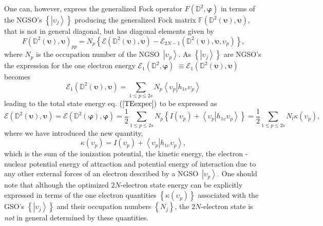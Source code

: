 \documentclass[aps,preprint]{revtex4}%
\begin{document}
One can, however, express the generalized Fock operator $F\left(
\mathbb{D}^{2},\mathbf{\varphi}\right)  $ in terms of the NGSO's $\left\{
\left\vert \upsilon_{j}\right\rangle \right\}  $ producing the generalized
Fock matrix $\mathbb{F}\left(  \mathbb{D}^{2}\left(  \mathbf{\upsilon}\right)
,\mathbf{\upsilon}\right)  ,$ that is not in general diagonal, but has
diagonal elements given by
\begin{equation}
F\left(  \mathbb{D}^{2}\left(  \mathbf{\upsilon}\right)  ,\mathbf{\upsilon
}\right)  _{pp}=N_{p}\left\{  \mathcal{E}\left(  \mathbb{D}^{2}\left(
\mathbf{\upsilon}\right)  ,\mathbf{\upsilon}\right)  -\mathcal{E}%
_{2N-1}\left(  \mathbb{D}^{2}\left(  \mathbf{\upsilon}\right)
,\mathbf{\upsilon,}\upsilon_{p}\right)  \right\}  ,
\end{equation}
where $N_{p}$ is the occupation number of the NGSO\ $\left\vert \upsilon
_{p}\right\rangle $. As $\left\{  \left\vert \upsilon_{j}\right\rangle
\right\}  $ are NGSO's the expression for the one electron energy
$\mathcal{E}_{1}\left(  \mathbb{D}^{2},\mathbf{\varphi}\right)  $
$\equiv\mathcal{E}_{1}\left(  \mathbb{D}^{2}\left(  \mathbf{\upsilon}\right)
,\mathbf{\upsilon}\right)  $ becomes%
\begin{equation}
\mathcal{E}_{1}\left(  \mathbb{D}^{2}\left(  \mathbf{\upsilon}\right)
,\mathbf{\upsilon}\right)  =\sum_{1\leq p\leq2s}N_{p}\left\langle \left.
\upsilon_{p}\right\vert h_{1\upsilon}\upsilon_{p}\right\rangle
\end{equation}
leading to the total state energy eq. $\left(  \ref{TEexpec}\right)  $ to be
expressed as
\begin{equation}
\mathcal{E}\left(  \mathbb{D}^{2}\left(  \mathbf{\upsilon}\right)
,\mathbf{\upsilon}\right)  =\mathcal{E}\left(  \mathbb{D}^{2}\left(
\mathbf{\varphi}\right)  ,\mathbf{\varphi}\right)  =\frac{1}{2}\sum_{1\leq
p\leq2s}N_{p}\left\{  I\left(  \upsilon_{p}\right)  +\left\langle \left.
\upsilon_{p}\right\vert h_{1\upsilon}\upsilon_{p}\right\rangle \right\}
=\frac{1}{2}%
{\textstyle\sum\limits_{1\leq p\leq2s}}
N_{l}\kappa\left(  \upsilon_{p}\right)  ,
\end{equation}
where we have introduced the new quantity,
\begin{equation}
\kappa\left(  \upsilon_{p}\right)  =I\left(  \upsilon_{p}\right)
+\left\langle \left.  \upsilon_{p}\right\vert h_{1\upsilon}\upsilon
_{p}\right\rangle ,
\end{equation}
which is the sum of the ionization potential, the kinetic energy, the electron
- nuclear potential energy of attraction and potential energy of interaction
due to any other external forces of an electron described by a
NGSO\ $\left\vert \upsilon_{p}\right\rangle $. One should note that although
the optimized $2N$-electron state energy can be explicitly expressed in terms
of the one electron quantities $\left\{  \kappa\left(  \upsilon_{p}\right)
\right\}  $ associated with the GSO's $\left\{  \left\vert \upsilon
_{j}\right\rangle \right\}  $ and their occupation numbers $\left\{
N_{j}\right\}  $, the $2N$-electron state is \emph{not }in general determined
by these quantities.
\end{document}
